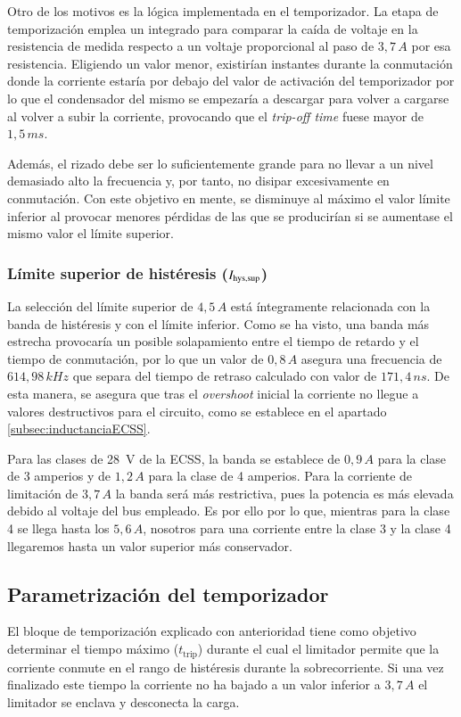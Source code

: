 \documentclass[12pt]{report} %
\begin{document}
Otro de los motivos es la lógica implementada en el temporizador. La etapa de temporización emplea un integrado para comparar la caída de voltaje en la resistencia de medida respecto a un voltaje proporcional al paso de $3{,}7\,A$ por esa resistencia. Eligiendo un valor menor, existirían instantes durante la conmutación donde la corriente estaría por debajo del valor de activación del temporizador por lo que el condensador del mismo se empezaría a descargar para volver a cargarse al volver a subir la corriente, provocando que el \textit{trip-off time} fuese mayor de $1{,}5\,ms$.

Además, el rizado debe ser lo suficientemente grande para no llevar a un nivel demasiado alto la frecuencia y, por tanto, no disipar excesivamente en conmutación. Con este objetivo en mente, se disminuye al máximo el valor límite inferior al provocar menores pérdidas de las que se producirían si se aumentase el mismo valor el límite superior.
 
\subsubsection{Límite superior de histéresis ($I_{\text{hys,sup}}$)}
La selección del límite superior de $4{,}5\,A$ está íntegramente relacionada con la banda de histéresis y con el límite inferior. 
Como se ha visto, una banda más estrecha provocaría un posible solapamiento entre el tiempo de retardo y el tiempo de conmutación, por lo que un valor de $0{,}8\,A$ asegura una frecuencia de $614{,}98\,kHz$ que separa del tiempo de retraso calculado con valor de $171{,}4\,ns$. De esta manera, se asegura que tras el \textit{overshoot} inicial la corriente no llegue a valores destructivos para el circuito, como se establece en el apartado \ref{subsec:inductanciaECSS}. 

Para las clases de 28~V de la ECSS, la banda se establece de $0{,}9 \,A$ para la clase de 3 amperios y de $1{,}2\,A$ para la clase de 4 amperios. Para la corriente de limitación de $3{,}7\,A$ la banda será más restrictiva, pues la potencia es más elevada debido al voltaje del bus empleado. Es por ello por lo que, mientras para la clase 4 se llega hasta los $5{,}6\,A$, nosotros para una corriente entre la clase 3 y la clase 4 llegaremos hasta un valor superior más conservador. 

\subsection{Parametrización del temporizador}
El bloque de temporización explicado con anterioridad tiene como objetivo determinar el tiempo máximo ($t_\text{trip}$) durante el cual el limitador permite que la corriente conmute en el rango de histéresis durante la sobrecorriente. Si una vez finalizado este tiempo la corriente no ha bajado a un valor inferior a $3{,}7\,A$ el limitador se enclava y desconecta la carga. 
\end{document}
